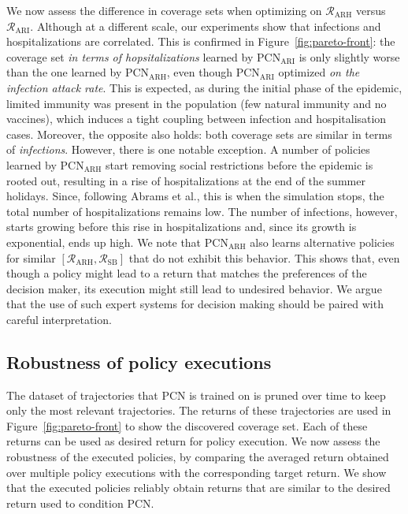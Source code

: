 \documentclass{article}
\newcommand{\mdprewardfn}{\mathcal{R}}
\begin{document}
We now assess the difference in coverage sets when optimizing on $\mdprewardfn_\text{ARH}$ versus $\mdprewardfn_\text{ARI}$. Although at a different scale, our experiments show that infections and hospitalizations are correlated. This is confirmed in Figure~\ref{fig:pareto-front}: the coverage set \emph{in terms of hopsitalizations} learned by $\text{PCN}_\text{ARI}$ is only slightly worse than the one learned by $\text{PCN}_\text{ARH}$, even though $\text{PCN}_\text{ARI}$ optimized \emph{on the infection attack rate}. This is expected, as during the initial phase of the epidemic, limited immunity was present in the population (few natural immunity and no vaccines), which induces a tight coupling between infection and hospitalisation cases. Moreover, the opposite also holds: both coverage sets are similar in terms of \emph{infections}. However, there is one notable exception. A number of policies learned by $\text{PCN}_\text{ARH}$ start removing social restrictions before the epidemic is rooted out, resulting in a rise of hospitalizations at the end of the summer holidays. Since, following Abrams et al., this is when the simulation stops, the total number of hospitalizations remains low. The number of infections, however, starts growing before this rise in hospitalizations and, since its growth is exponential, ends up high. We note that $\text{PCN}_\text{ARH}$ also learns alternative policies for similar $[\mdprewardfn_\text{ARH}, \mdprewardfn_\text{SB}]$ that do not exhibit this behavior. This shows that, even though a policy might lead to a return that matches the preferences of the decision maker, its execution might still lead to undesired behavior. We argue that the use of such expert systems for decision making should be paired with careful interpretation.

\subsection{Robustness of policy executions}
\label{sec:pcn-robustness}

The dataset of trajectories that PCN is trained on is pruned over time to keep only the most relevant trajectories. The returns of these trajectories are used in Figure~\ref{fig:pareto-front} to show the discovered coverage set. Each of these returns can be used as desired return for policy execution. We now assess the robustness of the executed policies, by comparing the averaged return obtained over multiple policy executions with the corresponding target return. We show that the executed policies reliably obtain returns that are similar to the desired return used to condition PCN.
\end{document}
